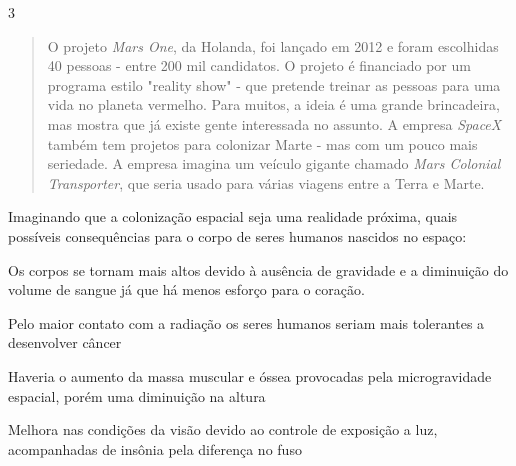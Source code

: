 \num{3}
  \begin{quote}
  O projeto \emph{Mars One}, da Holanda, foi lançado em 2012 e foram
  escolhidas 40 pessoas - entre 200 mil candidatos. O projeto é
  financiado por um programa estilo "reality show" - que pretende
  treinar as pessoas para uma vida no planeta vermelho. Para muitos, a
  ideia é uma grande brincadeira, mas mostra que já existe gente
  interessada no assunto. A empresa \emph{SpaceX} também tem projetos
  para colonizar Marte - mas com um pouco mais seriedade. A empresa
  imagina um veículo gigante chamado \emph{Mars Colonial Transporter},
  que seria usado para várias viagens entre a Terra e Marte.

\end{quote}

Imaginando que a colonização espacial seja uma realidade próxima, quais
possíveis consequências para o corpo de seres humanos nascidos no
espaço:

\begin{escolha}
\item
  Os corpos se tornam mais altos devido à ausência de gravidade e a
  diminuição do volume de sangue já que há menos esforço para o coração.
\item
  Pelo maior contato com a radiação os seres humanos seriam mais
  tolerantes a desenvolver câncer
\item
  Haveria o aumento da massa muscular e óssea provocadas pela
  microgravidade espacial, porém uma diminuição na altura
\item
  Melhora nas condições da visão devido ao controle de exposição a luz,
  acompanhadas de insônia pela diferença no fuso
\end{escolha}



